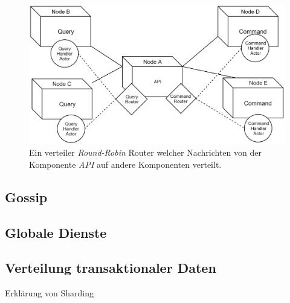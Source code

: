 \begin{figure}
    \centering
    \includegraphics[width=\linewidth]{gfx/implementation/ClusterRouter}
    \caption{Ein verteiler \textit{Round-Robin} Router welcher Nachrichten von der Komponente \textit{API} auf andere Komponenten verteilt.}
    \label{fig:implementation:routing}
\end{figure} 



\subsection{Gossip}
\label{subsec:implementation:gossip}
 
\subsection{Globale Dienste}
\label{subsec:implementation:singeltons}

\subsection{Verteilung transaktionaler Daten}
\label{subsec:implementation:akkaSharding}
Erklärung von Sharding

